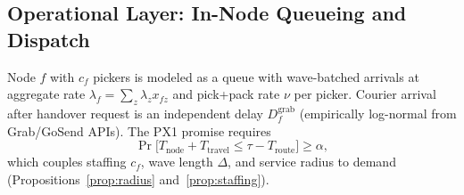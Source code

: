 \subsection{Operational Layer: In-Node Queueing and Dispatch}

Node $f$ with $c_f$ pickers is modeled as a queue with wave-batched arrivals at aggregate rate $\lambda_f=\sum_z\lambda_zx_{fz}$ and pick+pack rate $\nu$ per picker. Courier arrival after handover request is an independent delay $D^{\mathrm{grab}}_f$ (empirically log-normal from Grab/GoSend APIs). The PX1 promise requires
\begin{equation}\label{eq:px1}
\Pr\bigl[T_{\mathrm{node}}+T_{\mathrm{travel}}\le\tau-T_{\mathrm{route}}\bigr]\ge\alpha,
\end{equation}
which couples staffing $c_f$, wave length $\Delta$, and service radius to demand (Propositions~\ref{prop:radius} and~\ref{prop:staffing}).
